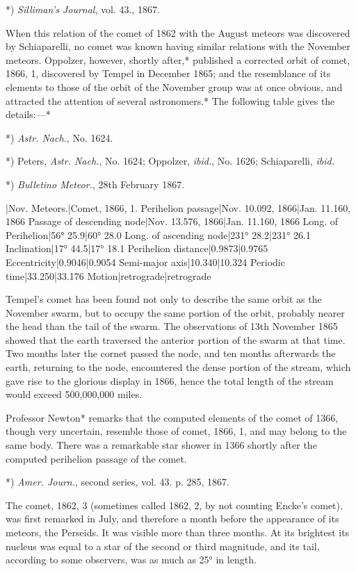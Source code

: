 \documentclass[a4paper, 12pt, oneside, polutonikogreek, english]{article}
\begin{document}
*) \emph{Silliman's Journal}, vol. 43., 1867.

When this relation of the comet of 1862 with the August meteors was discovered by Schiaparelli, no comet was known having similar relations with the November meteors. Oppolzer, however, shortly after,* published a corrected orbit of comet, 1866, 1, discovered by Tempel in December 1865; and the resemblance of its elements to those of the orbit of the November group was at once obvious, and attracted the attention of several astronomers.* The following table gives the details:---*

*) \emph{Astr. Nach.}, No. 1624.

*) Peters, \emph{Astr. Nach.}, No. 1624; Oppolzer, \emph{ibid.}, No. 1626; Schiaparelli, \emph{ibid.}

*) \emph{Bulletino Meteor.}, 28th February 1867.

|Nov. Meteors.|Comet, 1866, 1. 
Perihelion passage|Nov. 10.092, 1866|Jan. 11.160, 1866 
Passage of descending node|Nov. 13.576, 1866|Jan. 11.160, 1866 
Long. of Perihelion|56° 25.9|60° 28.0 
Long. of ascending node|231° 28.2|231° 26.1 
Inclination|17° 44.5|17° 18.1 
Perihelion distance|0.9873|0.9765 
Eccentricity|0.9046|0.9054 
Semi-major axis|10.340|10.324 
Periodic time|33.250|33.176 
Motion|retrograde|retrograde

Tempel's comet has been found not only to describe the same orbit as the November swarm, but to occupy the same portion of the orbit, probably nearer the head than the tail of the swarm. The observations of 13th November 1865 showed that the earth traversed the anterior portion of the swarm at that time. Two months later the cornet passed the node, and ten months afterwards the earth, returning to the node, encountered the dense portion of the stream, which gave rise to the glorious display in 1866, hence the total length of the stream would exceed 500,000,000 miles.

Professor Newton* remarks that the computed elements of the comet of 1366, though very uncertain, resemble those of comet, 1866, 1, and may belong to the same body. There was a remarkable star shower in 1366 shortly after the computed perihelion passage of the comet.

*) \emph{Amer. Journ.}, second series, vol. 43. p. 285, 1867.

The comet, 1862, 3 (sometimes called 1862, 2, by not counting Encke's comet), was first remarked in July, and therefore a month before the appearance of its meteors, the Perseids. It was visible more than three months. At its brightest its nucleus was equal to a star of the second or third magnitude, and its tail, according to some observers, was as much as 25° in length.
\end{document}

